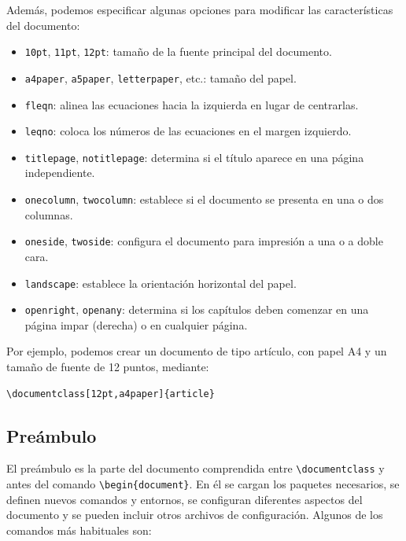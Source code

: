 \documentclass[11pt,a4paper]{article}
\theoremstyle{exercise}
\begin{document}
\noindent Además, podemos especificar algunas opciones para modificar las características del documento:

\begin{itemize}
    \item \verb|10pt|, \verb|11pt|, \verb|12pt|: tamaño de la
    fuente principal del documento.
    \item \verb|a4paper|, \verb|a5paper|, \verb|letterpaper|, etc.:
    tamaño del papel.
    \item \verb|fleqn|: alinea las ecuaciones hacia la izquierda
    en lugar de centrarlas.
    \item \verb|leqno|: coloca los números de las ecuaciones
    en el margen izquierdo.
    \item \verb|titlepage|, \verb|notitlepage|: determina si el
    título aparece en una página independiente.
    \item \verb|onecolumn|, \verb|twocolumn|: establece si el
    documento se presenta en una o dos columnas.
    \item \verb|oneside|, \verb|twoside|: configura el documento
    para impresión a una o a doble cara.
    \item \verb|landscape|: establece la orientación horizontal
    del papel.
    \item \verb|openright|, \verb|openany|: determina si los
    capítulos deben comenzar en una página impar (derecha)
    o en cualquier página.
\end{itemize}

Por ejemplo, podemos crear un documento de tipo artículo,
con papel A4 y un tamaño de fuente de 12 puntos, mediante:

\medskip

\begin{lstlisting}
\documentclass[12pt,a4paper]{article}
\end{lstlisting}


\subsection{Preámbulo}

El preámbulo es la parte del documento comprendida entre \verb|\documentclass| y antes del comando \verb|\begin{document}|. En él se cargan los paquetes necesarios, se definen nuevos comandos y entornos, se configuran diferentes aspectos del documento y se pueden incluir otros archivos de configuración. Algunos de los comandos más habituales son:
\end{document}
